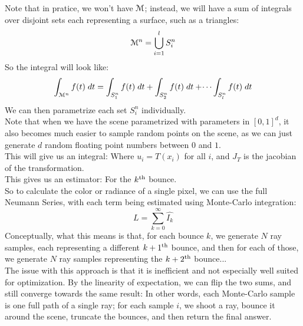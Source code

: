 \documentclass[12pt]{article}
\begin{document}
Note that in pratice, we won't have $\mathcal{M}$;
instead, we will have a sum of integrals 
over disjoint sets each
representing a surface, such as a triangles:
\[ \mathcal{M}^n = \bigcup_{i=1}^l S_i^n \]
So the integral will look like:
\[ \int_{\mathcal{M}^n} f(t)\;dt
= \int_{S_1^n} f(t)\;dt + \int_{S_2^n} f(t)\;dt +
\dots \int_{S_l^n} f(t)\;dt \]
We can then parametrize each set $S_i^n$ individually. \\

Note that when we have the scene parametrized
with parameters in $[0, 1]^d$, it also becomes
much easier to sample random points on the scene,
as we can just generate $d$ random floating point
numbers between $0$ and $1$. \\

This will give us an integral:
Where $u_i = T(x_i)$ for all $i$, and $J_T$
is the jacobian of the transformation. \\

This gives us an estimator:
For the $k^{\text{th}}$ bounce. \\

So to calculate the color or radiance of a single pixel,
we can use the full Neumann Series, with each term
being estimated using Monte-Carlo integration:
\[ L = \sum_{k=0}^\infty \widehat{I_k} \]
Conceptually, what this means is that, for each
bounce $k$, we generate $N$ ray samples,
each representing a different $k+1^{\text{th}}$ bounce,
and then for each of those, we generate
$N$ ray samples representing the $k+2^{\text{th}}$ bounce... \\

The issue with this approach is that it is inefficient
and not especially well suited for optimization.
By the linearity of expectation, we can flip
the two sums, and still converge towards the same 
result:
In other words, each Monte-Carlo sample is one full
path of a single ray; for each sample $i$,
we shoot a ray, bounce it around the scene,
truncate the bounces, and then return the final answer. \\
\end{document}
